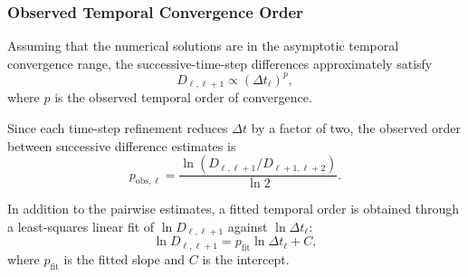 \subsubsection{Observed Temporal Convergence Order}

Assuming that the numerical solutions are in the asymptotic
temporal convergence range, the successive-time-step
differences approximately satisfy
\begin{equation}
D_{\ell,\ell+1}\propto(\Delta t_\ell)^p,
\label{eq:temporal_difference_scaling}
\end{equation}
where $p$ is the observed temporal order of convergence.

Since each time-step refinement reduces $\Delta t$ by a
factor of two, the observed order between successive
difference estimates is
\begin{equation}
\boxed{
p_{\mathrm{obs},\ell}
=
\frac{
\ln\left(D_{\ell,\ell+1}/D_{\ell+1,\ell+2}\right)
}{
\ln 2
}.
}
\label{eq:observed_temporal_order}
\end{equation}

In addition to the pairwise estimates, a fitted temporal
order is obtained through a least-squares linear fit of
$\ln D_{\ell,\ell+1}$ against $\ln\Delta t_\ell$:
\begin{equation}
\ln D_{\ell,\ell+1}
=
p_{\mathrm{fit}}\ln\Delta t_\ell+C,
\label{eq:temporal_log_fit}
\end{equation}
where $p_{\mathrm{fit}}$ is the fitted slope and $C$ is
the intercept.


